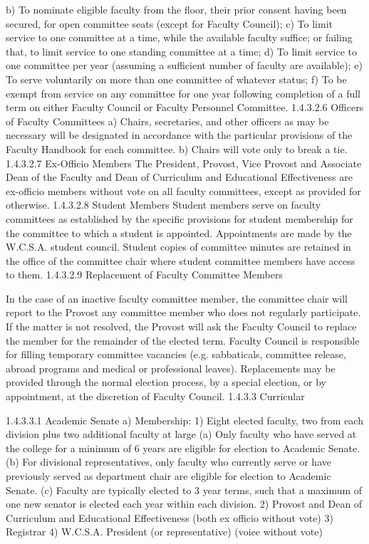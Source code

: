 \documentclass[letterpaper, 11pt]{article}
\begin{document}
			b) To nominate eligible faculty from the floor, their prior consent having been secured, for open committee seats (except for Faculty Council);
			c) To limit service to one committee at a time, while the available faculty suffice; or failing that, to limit service to one standing committee at a time;
			d) To limit service to one committee per year (assuming a sufficient number of faculty are available);
			e) To serve voluntarily on more than one committee of whatever status;
			f) To be exempt from service on any committee for one year following completion of a full term on either Faculty Council or Faculty Personnel Committee.
			1.4.3.2.6 Officers of Faculty Committees
			a) Chairs, secretaries, and other officers as may be necessary will be designated in accordance with the particular provisions of the Faculty Handbook for each committee.
			b) Chairs will vote only to break a tie.
			1.4.3.2.7 Ex-Officio Members
			The President, Provost, Vice Provost and Associate Dean of the Faculty and Dean of Curriculum and Educational Effectiveness are ex-officio members without vote on all faculty committees, except as provided for otherwise.
			1.4.3.2.8 Student Members
			Student members serve on faculty committees as established by the specific provisions for student membership for the committee to which a student is appointed. Appointments are made by the W.C.S.A. student council.  Student copies of committee minutes are retained in the office of the committee chair where student committee members have access to them.
			1.4.3.2.9 Replacement of Faculty Committee Members

			In the case of an inactive faculty committee member, the committee chair will report to the Provost any committee member who does not regularly participate.  If the matter is not resolved, the Provost will ask the Faculty Council to replace the member for the remainder of the elected term.
			Faculty Council is responsible for filling temporary committee vacancies (e.g. sabbaticals, committee release, abroad programs and medical or professional leaves).  Replacements may be provided through the normal election process, by a special election, or by appointment, at the discretion of Faculty Council.
			1.4.3.3 Curricular

			1.4.3.3.1 Academic Senate
			a) Membership:
			1) Eight elected faculty, two from each division plus two additional faculty at large
			(a) Only faculty who have served at the college for a minimum of 6 years are eligible for election to Academic Senate.
			(b) For divisional representatives, only faculty who currently serve or have previously served as department chair are eligible for election to Academic Senate.
			(c) Faculty are typically elected to 3 year terms, such that a maximum of one new senator is elected each year within each division.
			2) Provost and Dean of Curriculum and Educational Effectiveness (both ex officio without vote)
			3) Registrar
			4) W.C.S.A. President (or representative) (voice without vote)
\end{document}
